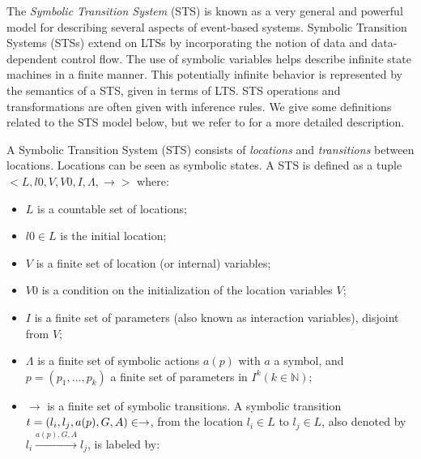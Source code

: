 The \textit{Symbolic Transition System} (STS)
\cite{hennessy1995symbolic} is known as a very general and
powerful model for describing several aspects of event-based
systems. Symbolic Transition Systems (STSs) extend on LTSs by
incorporating the notion of data and data-dependent control flow.
The use of symbolic variables helps describe infinite state
machines in a finite manner. This potentially infinite behavior
is represented by the semantics of a STS, given in terms of LTS.
STS operations and transformations are often given with inference
rules. We give some definitions related to the STS model below,
but we refer to \cite{FTW05} for a more detailed description.

\begin{definition}
    A Symbolic Transition System (STS) consists of
    \emph{locations} and \emph{transitions} between locations.
    Locations can be seen as symbolic states.
    A STS is defined as a tuple
    $<L,l0,V,V0,I,\Lambda,\rightarrow>$ where:

    \begin{itemize}
        \item $L$ is a countable set of locations;

        \item $l0 \in L$ is the initial location;

        \item $V$ is a finite set of location (or internal)
            variables;

        \item $V0$ is a condition on the initialization of the
            location variables $V$;

        \item $I$ is a finite set of parameters (also known as
            interaction variables), disjoint from $V$;

        \item $\Lambda$ is a finite set of symbolic actions
            $a(p)$ with $a$ a symbol, and $p=(p_1,\dots ,p_k)$ a
            finite set of parameters in $I^{k} (k \in
            \mathbb{N})$;

        \item $\rightarrow$ is a finite set of symbolic
            transitions. A symbolic transition $t =
            (l_i,l_j,a(p),G,\\A) \in \rightarrow$, from the
            location $l_i \in L$ to $l_j \in L$, also denoted by
            $l_i \xrightarrow{a(p),G,A} l_j$, is labeled by:


\end{itemize}
\end{definition}

